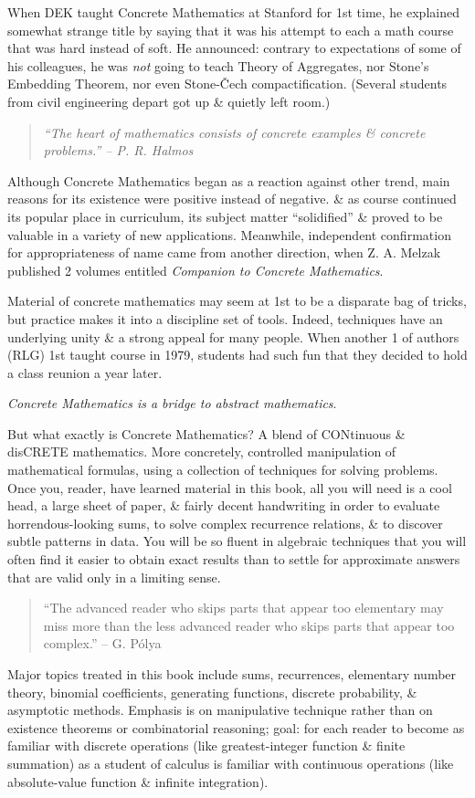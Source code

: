 \documentclass{article}
\begin{document}
\begin{enumerate}
	When DEK taught Concrete Mathematics at Stanford for 1st time, he explained somewhat strange title by saying that it was his attempt to each a math course that was hard instead of soft. He announced: contrary to expectations of some of his colleagues, he was {\it not} going to teach Theory of Aggregates, nor Stone's Embedding Theorem, nor even Stone-\v{C}ech compactification. (Several students from civil engineering depart got up \& quietly left room.)
	\begin{quote}\it
		``The heart of mathematics consists of concrete examples \& concrete problems.'' -- {\sc P. R. Halmos}
	\end{quote}
	Although Concrete Mathematics began as a reaction against other trend, main reasons for its existence were positive instead of negative. \& as course continued its popular place in curriculum, its subject matter ``solidified'' \& proved to be valuable in a variety of new applications. Meanwhile, independent confirmation for appropriateness of name came from another direction, when {\sc Z. A. Melzak} published 2 volumes entitled {\it Companion to Concrete Mathematics}.
	
	Material of concrete mathematics may seem at 1st to be a disparate bag of tricks, but practice makes it into a discipline set of tools. Indeed, techniques have an underlying unity \& a strong appeal for many people. When another 1 of authors (RLG) 1st taught course in 1979, students had such fun that they decided to hold a class reunion a year later.
	
	{\it Concrete Mathematics is a bridge to abstract mathematics}.
	
	But what exactly is Concrete Mathematics? A blend of CONtinuous \& disCRETE mathematics. More concretely, controlled manipulation of mathematical formulas, using a collection of techniques for solving problems. Once you, reader, have learned material in this book, all you will need is a cool head, a large sheet of paper, \& fairly decent handwriting in order to evaluate horrendous-looking sums, to solve complex recurrence relations, \& to discover subtle patterns in data. You will be so fluent in algebraic techniques that you will often find it easier to obtain exact results than to settle for approximate answers that are valid only in a limiting sense.
	\begin{quote}
		``The advanced reader who skips parts that appear too elementary may miss more than the less advanced reader who skips parts that appear too complex.'' -- {\sc G. P\'olya}
	\end{quote}
	Major topics treated in this book include sums, recurrences, elementary number theory, binomial coefficients, generating functions, discrete probability, \& asymptotic methods. Emphasis is on manipulative technique rather than on existence theorems or combinatorial reasoning; goal: for each reader to become as familiar with discrete operations (like greatest-integer function \& finite summation) as a student of calculus is familiar with continuous operations (like absolute-value function \& infinite integration).
	

\end{enumerate}
\end{document}
